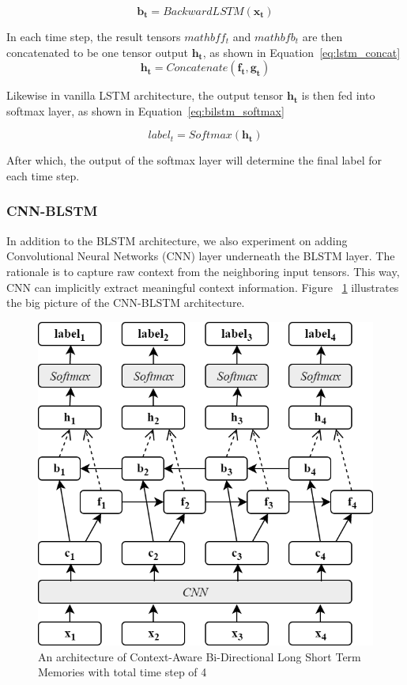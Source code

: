 \begin{equation}
\label{eq:lstmbackward}
\mathbf{b_{t}} = BackwardLSTM(\mathbf{x_{t}})
\end{equation}

In each time step, the result tensors $mathbf{f_{t}}$ and $mathbf{b_{t}}$ are then concatenated to be one tensor output $\mathbf{h_{t}}$, as shown in Equation~\ref{eq:lstm_concat}
\begin{equation}
\label{eq:lstm_concat}
\mathbf{h_{t}} = Concatenate(\mathbf{f_{t}}, \mathbf{g_{t}})
\end{equation}

Likewise in vanilla LSTM architecture, the output tensor $\mathbf{h_{t}}$ is then fed into softmax layer, as shown in Equation~\ref{eq:bilstm_softmax}

\begin{equation}
\label{eq:bilstm_softmax}
label_{t} = Softmax(\mathbf{h_{t}})
\end{equation}

After which, the output of the softmax layer will determine the final label for each time step.

\subsubsection{CNN-BLSTM}
In addition to the BLSTM architecture, we also experiment on adding Convolutional Neural Networks (CNN) layer underneath the BLSTM layer. The rationale is to capture raw context from the neighboring input tensors. This way, CNN can implicitly extract meaningful context information. Figure ~\ref{fig:cnnblstm} illustrates the big picture of the CNN-BLSTM architecture.

\begin{figure}
	\centering
	\includegraphics[width=0.75\linewidth]{images/cnnblstm}
	\caption{An architecture of Context-Aware Bi-Directional Long Short Term Memories with total time step of 4}
	\label{fig:cnnblstm}
\end{figure}

